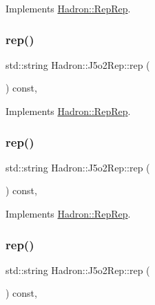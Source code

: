 Implements \mbox{\hyperlink{structHadron_1_1RepRep_ab3213025f6de249f7095892109575fde}{Hadron\+::\+Rep\+Rep}}.

\mbox{\label{structHadron_1_1J5o2Rep_a43d3fc5ff7f61a64d8dac3b700b2c140}} 
\subsubsection{\texorpdfstring{rep()}{rep()}\hspace{0.1cm}{\footnotesize\ttfamily [2/5]}}
{\footnotesize\ttfamily std\+::string Hadron\+::\+J5o2\+Rep\+::rep (\begin{DoxyParamCaption}{ }\end{DoxyParamCaption}) const\hspace{0.3cm}{\ttfamily [inline]}, {\ttfamily [virtual]}}



Implements \mbox{\hyperlink{structHadron_1_1RepRep_ab3213025f6de249f7095892109575fde}{Hadron\+::\+Rep\+Rep}}.

\mbox{\label{structHadron_1_1J5o2Rep_a43d3fc5ff7f61a64d8dac3b700b2c140}} 
\subsubsection{\texorpdfstring{rep()}{rep()}\hspace{0.1cm}{\footnotesize\ttfamily [3/5]}}
{\footnotesize\ttfamily std\+::string Hadron\+::\+J5o2\+Rep\+::rep (\begin{DoxyParamCaption}{ }\end{DoxyParamCaption}) const\hspace{0.3cm}{\ttfamily [inline]}, {\ttfamily [virtual]}}



Implements \mbox{\hyperlink{structHadron_1_1RepRep_ab3213025f6de249f7095892109575fde}{Hadron\+::\+Rep\+Rep}}.

\mbox{\label{structHadron_1_1J5o2Rep_a43d3fc5ff7f61a64d8dac3b700b2c140}} 
\subsubsection{\texorpdfstring{rep()}{rep()}\hspace{0.1cm}{\footnotesize\ttfamily [4/5]}}
{\footnotesize\ttfamily std\+::string Hadron\+::\+J5o2\+Rep\+::rep (\begin{DoxyParamCaption}{ }\end{DoxyParamCaption}) const\hspace{0.3cm}{\ttfamily [inline]}, {\ttfamily [virtual]}}



